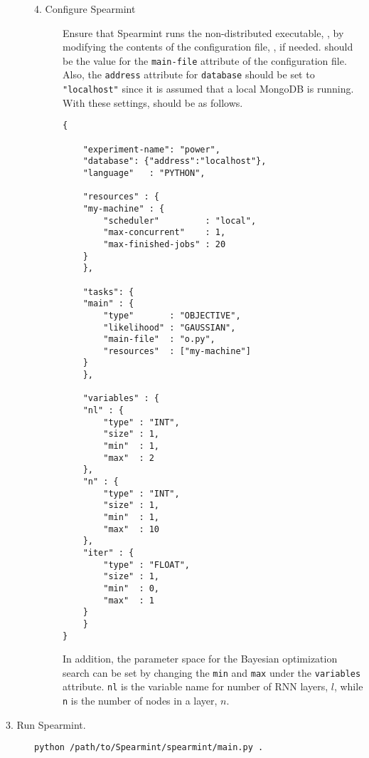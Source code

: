 \begin{description}
\begin{description}
  \item[4. Configure \textsf{Spearmint}] \hfill
    
    Ensure that \textsf{Spearmint} runs the non-distributed executable, , by modifying the contents of the configuration file, , if needed.
     should be the value for the \texttt{main-file} attribute of the configuration file.
    Also, the \texttt{address} attribute for \texttt{database} should be set to \texttt{"localhost"} since it is assumed that a local \textsf{MongoDB} is running.
    With these settings,  should be as follows.

\begin{verbatim}
{

    "experiment-name": "power",
    "database": {"address":"localhost"},
    "language"   : "PYTHON",
    
    "resources" : {
	"my-machine" : {
	    "scheduler"         : "local",
	    "max-concurrent"    : 1,
	    "max-finished-jobs" : 20
	}
    },

    "tasks": {
	"main" : {
	    "type"       : "OBJECTIVE",
	    "likelihood" : "GAUSSIAN",
	    "main-file"  : "o.py",
	    "resources"  : ["my-machine"]
	}
    },
    
    "variables" : {
	"nl" : {
	    "type" : "INT",
	    "size" : 1,
	    "min"  : 1,
	    "max"  : 2
	},
	"n" : {
	    "type" : "INT",
	    "size" : 1,
	    "min"  : 1,
	    "max"  : 10
	},
	"iter" : {
	    "type" : "FLOAT",
	    "size" : 1,
	    "min"  : 0,
	    "max"  : 1
	}
    }
}
\end{verbatim}

    In addition, the parameter space for the Bayesian optimization search can be set by changing the \texttt{min} and \texttt{max} under the \texttt{variables} attribute.
    \texttt{nl} is the variable name for number of RNN layers, $l$, while \texttt{n} is the number of nodes in a layer, $n$.



\end{description}

\item[3. Run \textsf{Spearmint}.] \hfill

\begin{verbatim}
python /path/to/Spearmint/spearmint/main.py .    
\end{verbatim}


\end{description}


